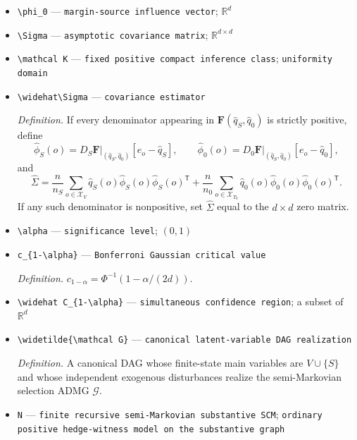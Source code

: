 \documentclass{article}
\begin{document}
\begin{itemize}
  \item \texttt{\textbackslash{}\allowbreak{}phi\_\allowbreak{}0} --- \texttt{margin-\allowbreak{}source influence vector}; \(\mathbb R^d\)
  \item \texttt{\textbackslash{}\allowbreak{}Sigma} --- \texttt{asymptotic covariance matrix}; \(\mathbb R^{d\times d}\)
  \item \texttt{\textbackslash{}\allowbreak{}mathcal K} --- \texttt{fixed positive compact inference class}; \texttt{uniformity domain}
  \item \texttt{\textbackslash{}\allowbreak{}widehat\textbackslash{}\allowbreak{}Sigma} --- \texttt{covariance estimator}
  \par\smallskip\noindent\emph{Definition.} If every denominator appearing in \(\mathbf F(\widehat q_S,\widehat q_0)\) is strictly positive, define \[\widehat\phi_S(o)=\left.D_S\mathbf F\right|_{(\widehat q_S,\widehat q_0)}[e_o-\widehat q_S],\qquad \widehat\phi_0(o)=\left.D_0\mathbf F\right|_{(\widehat q_S,\widehat q_0)}[e_o-\widehat q_0],\] and \[\widehat\Sigma=\frac n{n_S}\sum_{o\in\mathcal X_V}\widehat q_S(o)\widehat\phi_S(o)\widehat\phi_S(o)^{\mathsf T}+\frac n{n_0}\sum_{o\in\mathcal X_{T_0}}\widehat q_0(o)\widehat\phi_0(o)\widehat\phi_0(o)^{\mathsf T}.\] If any such denominator is nonpositive, set \(\widehat\Sigma\) equal to the \(d\times d\) zero matrix.
  \item \texttt{\textbackslash{}\allowbreak{}alpha} --- \texttt{significance level}; \((0,1)\)
  \item \texttt{c\_\allowbreak{}\{1-\allowbreak{}\textbackslash{}\allowbreak{}alpha\}\allowbreak{}} --- \texttt{Bonferroni Gaussian critical value}
  \par\smallskip\noindent\emph{Definition.} \(c_{1-\alpha}=\Phi^{-1}(1-\alpha/(2d))\).
  \item \texttt{\textbackslash{}\allowbreak{}widehat C\_\allowbreak{}\{1-\allowbreak{}\textbackslash{}\allowbreak{}alpha\}\allowbreak{}} --- \texttt{simultaneous confidence region}; a subset of \(\mathbb R^d\)
  \item \texttt{\textbackslash{}\allowbreak{}widetilde\{\textbackslash{}\allowbreak{}mathcal G\}\allowbreak{}} --- \texttt{canonical latent-\allowbreak{}variable DAG realization}
  \par\smallskip\noindent\emph{Definition.} A canonical DAG whose finite-state main variables are \(V\cup\{S\}\) and whose independent exogenous disturbances realize the semi-Markovian selection ADMG \(\mathcal G\).
  \item \texttt{N} --- \texttt{finite recursive semi-\allowbreak{}Markovian substantive SCM}; \texttt{ordinary positive hedge-\allowbreak{}witness model on the substantive graph}

\end{itemize}
\end{document}
